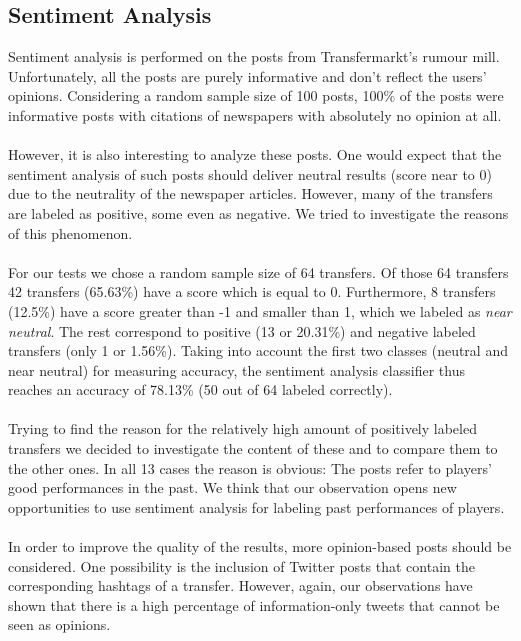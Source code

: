 \documentclass{article}
\begin{document}
\subsection{Sentiment Analysis}
\label{eval:sen}
Sentiment analysis is performed on the posts from Transfermarkt's rumour mill. Unfortunately, all the posts are purely informative and don't reflect the users' opinions. Considering a random sample size of 100 posts, 100\% of the posts were informative posts with citations of newspapers with absolutely no opinion at all. 
\\ \\
However, it is also interesting to analyze these posts. One would expect that the sentiment analysis of such posts should deliver neutral results (score near to 0) due to the neutrality of the newspaper articles. However, many of the transfers are labeled as positive, some even as negative. We tried to investigate the reasons of this phenomenon. 
\\ \\
For our tests we chose a random sample size of 64 transfers. Of those 64 transfers 42 transfers (65.63\%) have a score which is equal to 0. Furthermore, 8 transfers (12.5\%) have a score greater than -1 and smaller than 1, which we labeled as \emph{near neutral}. The rest correspond to positive (13 or 20.31\%) and negative labeled transfers (only 1 or 1.56\%). Taking into account the first two classes (neutral and near neutral) for measuring accuracy, the sentiment analysis classifier thus reaches an accuracy of 78.13\% (50 out of 64 labeled correctly).
\\ \\
Trying to find the reason for the relatively high amount of positively labeled transfers we decided to investigate the content of these and to compare them to the other ones. In all 13 cases the reason is obvious: The posts refer to players' good performances in the past. We think that our observation opens new opportunities to use sentiment analysis for labeling past performances of players.
\\ \\
In order to improve the quality of the results, more opinion-based posts should be considered. One possibility is the inclusion of Twitter posts that contain the corresponding hashtags of a transfer. However, again, our observations have shown that there is a high percentage of information-only tweets that cannot be seen as opinions.
\end{document}

